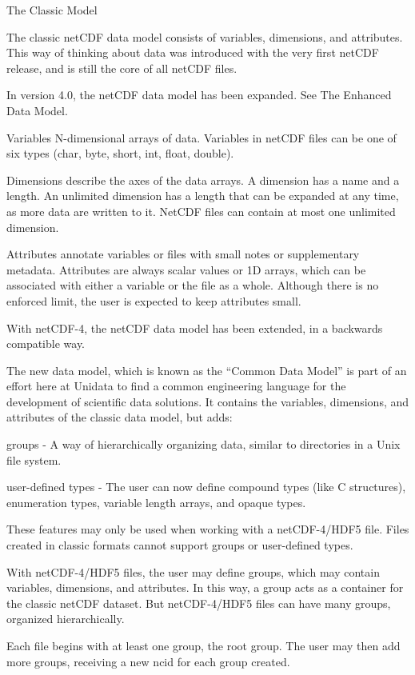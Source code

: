 \tab
\begin{framed}

The Classic Model

The classic netCDF data model consists of variables, dimensions, and attributes. This way of thinking about data was introduced with the very first netCDF release, and is still the core of all netCDF files.

In version 4.0, the netCDF data model has been expanded. See The Enhanced Data Model.

Variables
N-dimensional arrays of data. Variables in netCDF files can be one of six types (char, byte, short, int, float, double).

Dimensions
describe the axes of the data arrays. A dimension has a name and a length. An unlimited dimension has a length that can be expanded at any time, as more data are written to it. NetCDF files can contain at most one unlimited dimension.

Attributes
annotate variables or files with small notes or supplementary metadata. Attributes are always scalar values or 1D arrays, which can be associated with either a variable or the file as a whole. Although there is no enforced limit, the user is expected to keep attributes small.

With netCDF-4, the netCDF data model has been extended, in a backwards compatible way.

The new data model, which is known as the “Common Data Model” is part of an effort here at Unidata to find a common engineering language for the development of scientific data solutions. It contains the variables, dimensions, and attributes of the classic data model, but adds:

groups - A way of hierarchically organizing data, similar to directories in a Unix file system.

user-defined types - The user can now define compound types (like C structures), enumeration types, variable length arrays, and opaque types.

These features may only be used when working with a netCDF-4/HDF5 file. Files created in classic formats cannot support groups or user-defined types.

With netCDF-4/HDF5 files, the user may define groups, which may contain variables, dimensions, and attributes. In this way, a group acts as a container for the classic netCDF dataset. But netCDF-4/HDF5 files can have many groups, organized hierarchically.

Each file begins with at least one group, the root group. The user may then add more groups, receiving a new ncid for each group created.


\end{framed}
